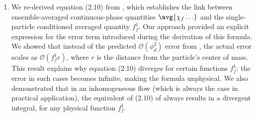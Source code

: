 \begin{enumerate}
    \item We re-derived equation (2.10) from \citet{batchelor1972sedimentation}, which establishes the link between ensemble-averaged continuous-phase quantities $\avg{\chi_f\ldots}$ and the single-particle conditioned averaged quantity $f_f^1$. 
    Our approach provided an explicit expression for the error term introduced during the derivation of this formula.
    We showed that instead of the predicted $\mathcal{O}(\phi_d^2)$ error from \citet{batchelor1972sedimentation}, the actual error scales as $\mathcal{O}(f_f^1 r)$, where $r$ is the distance from the particle's center of mass. 
    This result explains why equation (2.10) diverges for certain functions $f_f^1$: the error in such cases becomes infinite, making the formula unphysical.
    We also demonstrated that in an inhomogeneous flow (which is always the case in practical application), the equivalent of (2.10) of \citet{batchelor1972sedimentation} always results in a divergent integral, for any physical function $f_f^1$.
\end{enumerate}